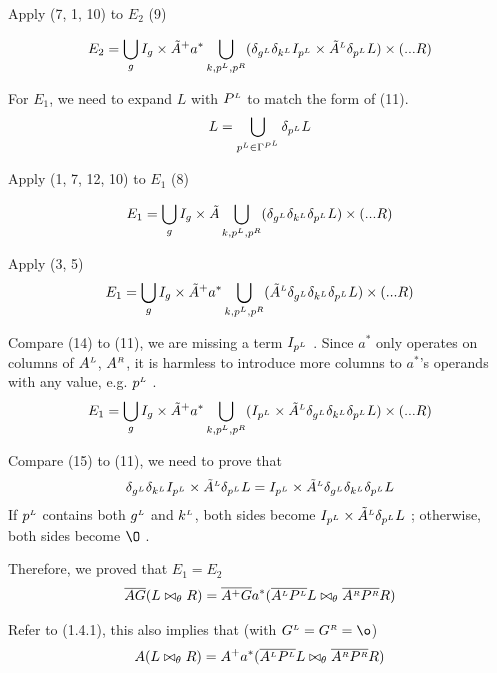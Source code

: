 \documentclass[article]{article}
\newcommand{\U}{\bigcup}
\newcommand{\ag}[1]{\overline{#1}}
\newcommand{\LL}{^\mathsmaller{\mathsmaller L}}
\newcommand{\RR}{^\mathsmaller{\mathsmaller R}}
\newcommand{\EA}{\tilde{A}}
\begin{document}
Apply (7, 1, 10) to $E_2$ (9)

\begin{align}
  E_2 = \U_g I_g \times \EA^+ a^*  \U_{k,p\LL,p\RR} (\delta_{g\LL} \delta_{k\LL} 
  I_{p\LL} \times \EA \LL \delta_{p\LL} L) \times (...R)
\end{align}

For $E_1$, we need to expand $L$ with $P\LL$ to match the form of (11).
 \begin{align}
 L = \U_{p\LL \in \Gamma^{P\LL}} \delta_{p\LL} L
 \end{align}

Apply (1, 7, 12, 10) to $E_1$ (8)

\begin{align}
  E_1 = \U_g I_g \times \EA  \U_{k,p\LL,p\RR} (\delta_{g\LL} \delta_{k\LL} \delta_{p\LL} L) \times (...R)
\end{align}

Apply (3, 5)
\begin{align}
  E_1 = \U_g I_g \times \EA^+ a^*  \U_{k,p\LL,p\RR} (\EA \LL \delta_{g\LL} \delta_{k\LL} \delta_{p\LL} L) \times (...R)
\end{align}

Compare (14) to (11), we are missing a term $I_{p\LL}$ . 
Since $a^*$ only operates on columns of $A\LL$, $A\RR$, 
it is harmless to introduce more columns to $a^*$'s operands with any value, e.g. ${p\LL}$ .
\begin{align}
  E_1 = \U_g I_g \times \EA^+ a^*  \U_{k,p\LL,p\RR} (
  I_{p\LL} \times \EA \LL \delta_{g\LL} \delta_{k\LL} \delta_{p\LL} L) \times (...R)
\end{align}

Compare (15) to (11), we need to prove that
\begin{align}
  \delta_{g\LL} \delta_{k\LL}  I_{p\LL} \times \EA \LL \delta_{p\LL} L
 =  I_{p\LL} \times \EA \LL \delta_{g\LL} \delta_{k\LL} \delta_{p\LL} L
\end{align}
If $p\LL$ contains both $g\LL$ and $k\LL$, 
both sides become $I_{p\LL} \times \EA \LL \delta_{p\LL} L$ ;
otherwise, both sides become $\O$ .

Therefore, we proved that $E_1 = E_2$
\begin{align}
\ag{AG} (L \bowtie_\theta R)  = 
 \ag{A^+ G} a^* (\ag{A\LL P\LL} L \bowtie_\theta \ag{A\RR P\RR} R) 
\end{align}

Refer to  (1.4.1), this also implies that (with $G\LL=G\RR=\o$)
\begin{align}
A (L \bowtie_\theta R)  = 
A^+ a^* (\ag{A\LL P\LL} L \bowtie_\theta \ag{A\RR P\RR} R) 
\end{align}
\end{document}

